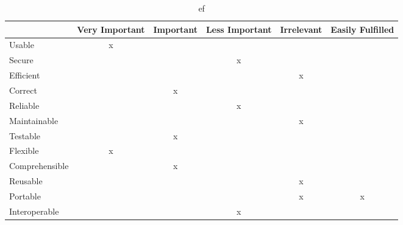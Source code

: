 \begin{table}[htbp]
	\centering
		\begin{tabular}{| l | m{} | m{}| m{}| m{}|m{}|} \hline
		  & Very  Important & Important & Less Important & Irrelevant & Easily Fulfilled \\ \hline
		Usable  & \multicolumn{1}{c|}{x} & & & & \\ \hline
		Secure  & & & \multicolumn{1}{c|}{x} & & \\ \hline
		Efficient & & & & \multicolumn{1}{c|}{x} & \\ \hline
		Correct  & & \multicolumn{1}{c|}{x} & & & \\ \hline
		Reliable  & & & \multicolumn{1}{c|}{x} & & \\ \hline
		Maintainable  & & & & \multicolumn{1}{c|}{x} & \\ \hline
		Testable  & & \multicolumn{1}{c|}{x} & & & \\ \hline
		Flexible  & \multicolumn{1}{c|}{x} & & & & \\ \hline
		Comprehensible  & & \multicolumn{1}{c|}{x} & & & \\ \hline
		Reusable  & & & & \multicolumn{1}{c|}{x} & \\ \hline
		Portable & & & & \multicolumn{1}{c|}{x} & \multicolumn{1}{c|}{x} \\ \hline
		Interoperable & & & \multicolumn{1}{c|}{x} & & \\ \hline
		\end{tabular}
	\caption{ef}
	\label{tab:ef}
\end{table}

